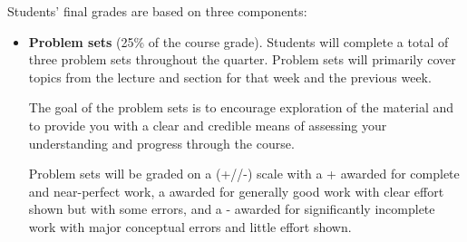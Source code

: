\documentclass[11pt, article, oneside]{memoir}
\theoremstyle{Assumption}
\begin{document}
Students’ final grades are based on three components:
\begin{itemize}

\item \textbf{Problem sets} (25\% of the course grade). Students will complete a total of three problem sets throughout the quarter. Problem sets will primarily cover topics from the lecture and section for that week and the previous week.

The goal of the problem sets is to encourage exploration of the material and to provide you with a clear and credible means of assessing your understanding and progress through the course.

Problem sets will be graded on a (+/\checkmark/-) scale with a + awarded for complete and near-perfect work, a \checkmark awarded for generally good work with clear effort shown but with some errors, and a - awarded for significantly incomplete work with major conceptual errors and little effort shown.
 

\end{itemize}
\end{document}
